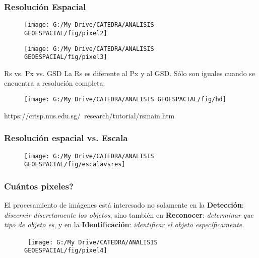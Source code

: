 \documentclass[14pt]{beamer}
\begin{document}
\begin{frame}
\frametitle{Resolución Espacial}
 \begin{figure}
    \centering
    \texttt{[image: G:/My Drive/CATEDRA/ANALISIS GEOESPACIAL/fig/pixel2]}
  \end{figure}
\end{frame}
\begin{frame}
 \begin{figure}
    \centering
    \texttt{[image: G:/My Drive/CATEDRA/ANALISIS GEOESPACIAL/fig/pixel3]}
  \end{figure}
\end{frame}
\begin{frame}
\begin{exampleblock}{Rs vs. Px vs. GSD}
\small{La Rs es diferente al Px y al GSD. Sólo son iguales cuando se encuentra a resolución completa.}
\end{exampleblock}
 \begin{figure}
    \centering
    \texttt{[image: G:/My Drive/CATEDRA/ANALISIS GEOESPACIAL/fig/hd]}
  \end{figure}
\tiny{https://crisp.nus.edu.sg/~research/tutorial/rsmain.htm}
\end{frame}
\begin{frame}
\frametitle{Resolución espacial vs. Escala}
 \begin{figure}
    \centering
    \texttt{[image: G:/My Drive/CATEDRA/ANALISIS GEOESPACIAL/fig/escalavsres]}
  \end{figure}
\end{frame}
\begin{frame}
\frametitle{Cuántos pixeles?}
\small{El procesamiento de imágenes está interesado no solamente en la \textbf{Detección}: \emph{discernir discretamente los objetos}, sino también en \textbf{Reconocer}: \emph{determinar que tipo de objeto es}, y en la \textbf{Identificación}: \emph{identificar el objeto específicamente.}}
 \begin{figure}
    \centering
\    \texttt{[image: G:/My Drive/CATEDRA/ANALISIS GEOESPACIAL/fig/pixel4]}
  \end{figure}
\end{frame}
\end{document}

